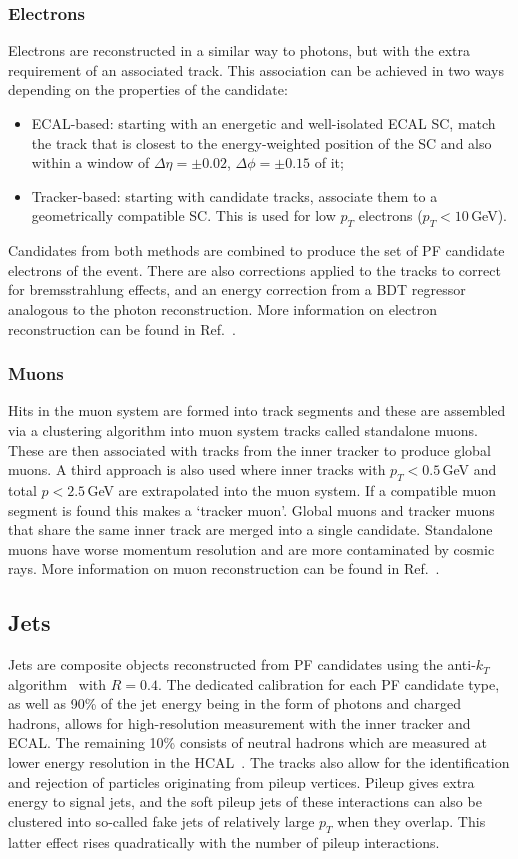 \subsubsection{Electrons}
Electrons are reconstructed in a similar way to photons, but with the extra requirement of an associated track. This association can be achieved in two ways depending on the properties of the candidate:
\begin{itemize}
    \item ECAL-based: starting with an energetic and well-isolated ECAL SC, match the track that is closest to the energy-weighted position of the SC and also within a window of $\Delta\eta=\pm{0.02}$, $\Delta\phi=\pm{0.15}$ of it;
    \item Tracker-based: starting with candidate tracks, associate them to a geometrically compatible SC. This is used for low $p_{T}$ electrons ($p_{T} < 10$\,GeV).
\end{itemize}
Candidates from both methods are combined to produce the set of PF candidate electrons of the event. 
There are also corrections applied to the tracks to correct for bremsstrahlung effects, and an energy correction from a BDT regressor analogous to the photon reconstruction. 
More information on electron reconstruction can be found in Ref.~\cite{ElectronReco}.

\subsubsection{Muons}
Hits in the muon system are formed into track segments and these are assembled via a clustering algorithm into muon system tracks called standalone muons. 
These are then associated with tracks from the inner tracker to produce global muons. A third approach is also used where inner tracks with $p_{T}<0.5$\,GeV and total $p < 2.5$\,GeV are extrapolated into the muon system. If a compatible muon segment is found this makes a `tracker muon'. Global muons and tracker muons that share the same inner track are merged into a single candidate. 
Standalone muons have worse momentum resolution and are more contaminated by cosmic rays.
More information on muon reconstruction can be found in Ref.~\cite{MuonReco}.

\subsection{Jets}
Jets are composite objects reconstructed from PF candidates using the anti-$k_T$ algorithm~\cite{AntiKt} with $R=0.4$. 
The dedicated calibration for each PF candidate type, as well as 90\% of the jet energy being in the form of photons and charged hadrons, allows for high-resolution measurement with the inner tracker and ECAL. The remaining 10\% consists of neutral hadrons which are measured at lower energy resolution in the HCAL~\cite{JetPerformance}. 
The tracks also allow for the identification and rejection of particles originating from pileup vertices. Pileup gives extra energy to signal jets, and the soft pileup jets of these interactions can also be clustered into so-called fake jets of relatively large $p_{T}$ when they overlap. This latter effect rises quadratically with the number of pileup interactions. 

